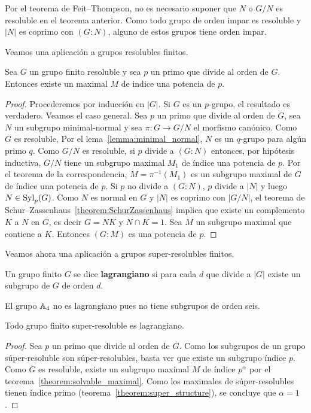 	Por el teorema de Feit--Thompson, no es necesario suponer que $N$ o $G/N$
	es resoluble en el teorema anterior. Como
	todo grupo de orden impar es resoluble y $|N|$ es coprimo con $(G:N)$,
	alguno de estos grupos tiene orden impar.

\medskip
Veamos una aplicación a grupos resolubles finitos.

\begin{theorem}
	\label{theorem:solvable_maximal}
	Sea $G$ un grupo finito resoluble y sea $p$ un primo que divide al orden de $G$.
	Entonces existe un maximal $M$ de indice una potencia de $p$.
\end{theorem}

\begin{proof}
	Procederemos por inducción en $|G|$. Si $G$ es un $p$-grupo, el resultado
	es verdadero. Veamos el caso general. Sea $p$ un primo que divide al orden
	de $G$, sea $N$ un subgrupo minimal-normal y sea $\pi\colon G\to G/N$ el
	morfismo canónico. Como $G$ es resoluble, Por el lema~\ref{lemma:minimal_normal}, $N$ es un
	$q$-grupo para algún primo $q$. Como $G/N$ es resoluble, si $p$ divide a
	$(G:N)$ entonces, por hipótesis inductiva, $G/N$ tiene un subgrupo maximal
	$M_1$ de índice una potencia de $p$. Por el teorema de la correspondencia,
	$M=\pi^{-1}(M_1)$ es un subgrupo maximal de $G$ de índice una potencia de
	$p$. Si $p$ no divide a $(G:N)$, $p$ divide a $|N|$ y luego
	$N\in\mathrm{Syl}_p(G)$. Como $N$ es normal en $G$ y $|N|$ es coprimo con $|G/N|$,
	el teorema de Schur--Zassenhaus~\ref{theorem:SchurZassenhaus} implica que
	existe un complemento $K$ a $N$ en $G$, es decir $G=NK$ y $N\cap K=1$. Sea
	$M$ un subgrupo maximal que contiene a $K$. Entonces $(G:M)$ es una
	potencia de $p$.
\end{proof}

Veamos ahora una aplicación a grupos super-resolubles finitos.

\begin{definition}
	Un grupo finito $G$ se dice \textbf{lagrangiano} si para cada $d$ que
	divide a $|G|$ existe un subgrupo de $G$ de orden $d$.
\end{definition}

El grupo $\mathbb{A}_4$ no es lagrangiano pues no tiene subgrupos de orden seis.

\begin{theorem}
	Todo grupo finito super-resoluble es lagrangiano. 
\end{theorem}

\begin{proof}
	Sea $p$ un primo que divide al orden de $G$.  Como los subgrupos de un
	grupo súper-resoluble son súper-resolubles, basta ver que existe un subgrupo
	índice $p$. Como $G$ es resoluble, existe un subgrupo maximal $M$ de índice
	$p^{\alpha}$ por el teorema~\ref{theorem:solvable_maximal}. Como los
	maximales de súper-resolubles tienen índice primo
	(teorema~\ref{theorem:super_structure}), se concluye que $\alpha=1$.
\end{proof}
